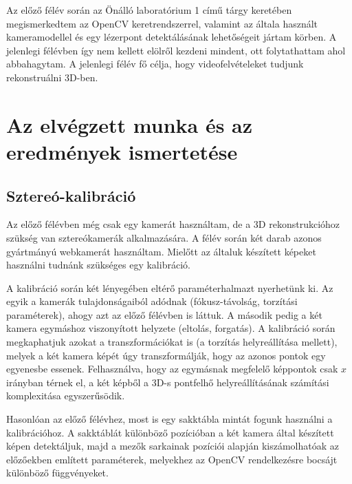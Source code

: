 \documentclass[a4paper,oneside]{article}
\begin{document}
Az előző félév során az Önálló laboratórium 1 című tárgy keretében megismerkedtem az OpenCV keretrendszerrel, valamint az általa használt kameramodellel és egy lézerpont detektálásának lehetőségeit jártam körben. A jelenlegi félévben így nem kellett elölről kezdeni mindent, ott folytathattam ahol abbahagytam. A jelenlegi félév fő célja, hogy videofelvételeket tudjunk rekonstruálni 3D-ben.

\newpage
\section{Az elvégzett munka és az eredmények ismertetése}
\label{sec:az-elvegzett-munka}

\subsection{Sztereó-kalibráció}
\label{sec:sztereo-kalibracio}

Az előző félévben még csak egy kamerát használtam, de a 3D rekonstrukcióhoz szükség van sztereókamerák alkalmazására. A félév során két darab azonos gyártmányú webkamerát használtam. Mielőtt az általuk készített képeket használni tudnánk szükséges egy kalibráció.

A kalibráció során két lényegében eltérő paraméterhalmazt nyerhetünk ki. Az egyik a kamerák tulajdonságaiból adódnak (fókusz-távolság, torzítási paraméterek), ahogy azt az előző félévben is láttuk. A második pedig a két kamera egymáshoz viszonyított helyzete (eltolás, forgatás). A kalibráció során megkaphatjuk azokat a transzformációkat is (a torzítás helyreállítása mellett), melyek a két kamera képét úgy transzformálják, hogy az azonos pontok egy egyenesbe essenek. Felhasználva, hogy az egymásnak megfelelő képpontok csak $x$ irányban térnek el, a két képből a 3D-s pontfelhő helyreállításának számítási komplexitása egyszerűsödik.

Hasonlóan az előző félévhez, most is egy sakktábla mintát fogunk használni a kalibrációhoz. A sakktáblát különböző pozícióban a két kamera által készített képen detektáljuk, majd a mezők sarkainak pozíciói alapján kiszámolhatóak az előzőekben említett paraméterek, melyekhez az OpenCV rendelkezésre bocsájt különböző függvényeket.
\end{document}
